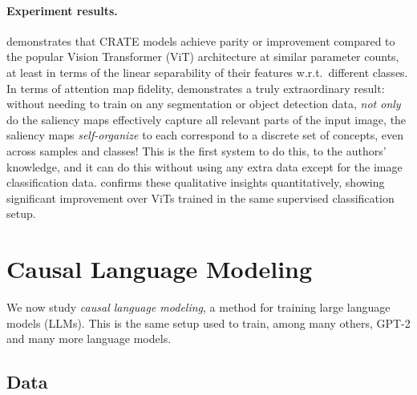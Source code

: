 \documentclass[../../book-main.tex]{subfiles}
\begin{document}
\paragraph{Experiment results.} 

 demonstrates that CRATE models achieve parity or improvement compared to the popular Vision Transformer (ViT) architecture at similar parameter counts, at least in terms of the linear separability of their features w.r.t.~different classes. In terms of attention map fidelity,  demonstrates a truly extraordinary result: without needing to train on any segmentation or object detection data, \textit{not only} do the saliency maps effectively capture all relevant parts of the input image, the saliency maps \textit{self-organize} to each correspond to a discrete set of concepts, even across samples and classes! This is the first system to do this, to the authors' knowledge, and it can do this without using any extra data except for the image classification data.  confirms these qualitative insights quantitatively, showing significant improvement over ViTs trained in the same supervised classification setup.

\section{Causal Language Modeling}\label{sec:clm_text}

We now study \textit{causal language modeling}, a method for training large language models (LLMs). This is the same setup used to train, among many others, GPT-2 and many more language models. 

\subsection{Data} \label{sub:clm_text_data}
\end{document}
